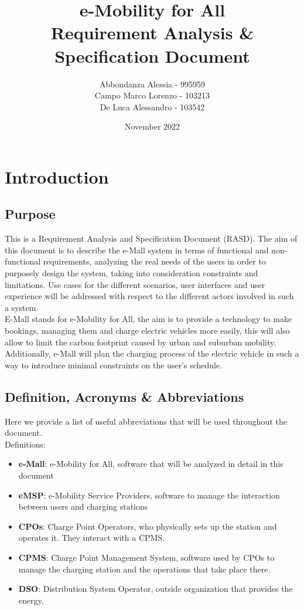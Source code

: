 \documentclass[12pt]{report}
\title{%
  \textbf{e-Mobility for All} \\
  \large Requirement Analysis \& Specification Document \\}
\author{Abbondanza Alessia - 995959\\
    Campo Marco Lorenzo - 103213\\
    De Luca Alessandro - 103542}
\date{November 2022}
\begin{document}
\maketitle


\thispagestyle{empty}
\tableofcontents %
\thispagestyle{empty}
\cleardoublepage
\chapter{Introduction}
\section{Purpose}
This is a Requirement Analysis and Specification Document (RASD). The aim of this document is to describe the e-Mall system in terms of functional and non-functional requirements, analyzing the real needs of the users in order to purposely design the system, taking into consideration constraints and limitations. Use cases for the different scenarios, user interfaces and user experience will be addressed with respect to the different actors involved in such a system. 
\\E-Mall stands for e-Mobility for All, the aim is to provide a technology to make bookings, managing them and charge electric vehicles more easily, this will also allow to limit the carbon footprint caused by urban and suburban mobility. Additionally, e-Mall will plan the charging process of the electric vehicle in such a way to introduce minimal constraints on the user's schedule.

\section{Definition, Acronyms \& Abbreviations}

Here we provide a list of useful abbreviations that will be used throughout the document.\\

Definitions:
\begin{itemize}
    \item\textbf{e-Mall}: e-Mobility for All, software that will be analyzed in detail in this document
    \item\textbf{eMSP}: e-Mobility Service Providers, software to manage the interaction between users and charging stations
    \item\textbf{CPOs}: Charge Point Operators, who physically sets up the station and operates it. They interact with a CPMS.
    \item\textbf{CPMS}: Charge Point Management System, software used by CPOs to manage the charging station and the operations that take place there.
    \item\textbf{DSO}: Distribution System Operator, outside organization that provides the energy.\\
\end{itemize}
\end{document}
